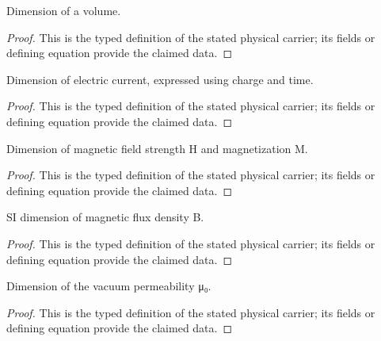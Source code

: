 \begin{definition}
  \label{def:physics:IPhO_2026_3_A_2:aux002}
  Dimension of a volume.
\end{definition}
\begin{proof}
  This is the typed definition of the stated physical carrier; its fields or defining equation provide the claimed data.
\end{proof}

\begin{definition}
  \label{def:physics:IPhO_2026_3_A_2:aux003}
  Dimension of electric current, expressed using charge and time.
\end{definition}
\begin{proof}
  This is the typed definition of the stated physical carrier; its fields or defining equation provide the claimed data.
\end{proof}

\begin{definition}
  \label{def:physics:IPhO_2026_3_A_2:aux004}
  Dimension of magnetic field strength H and magnetization M.
\end{definition}
\begin{proof}
  This is the typed definition of the stated physical carrier; its fields or defining equation provide the claimed data.
\end{proof}

\begin{definition}
  \label{def:physics:IPhO_2026_3_A_2:aux005}
  SI dimension of magnetic flux density B.
\end{definition}
\begin{proof}
  This is the typed definition of the stated physical carrier; its fields or defining equation provide the claimed data.
\end{proof}

\begin{definition}
  \label{def:physics:IPhO_2026_3_A_2:aux006}
  Dimension of the vacuum permeability μ₀.
\end{definition}
\begin{proof}
  This is the typed definition of the stated physical carrier; its fields or defining equation provide the claimed data.
\end{proof}

